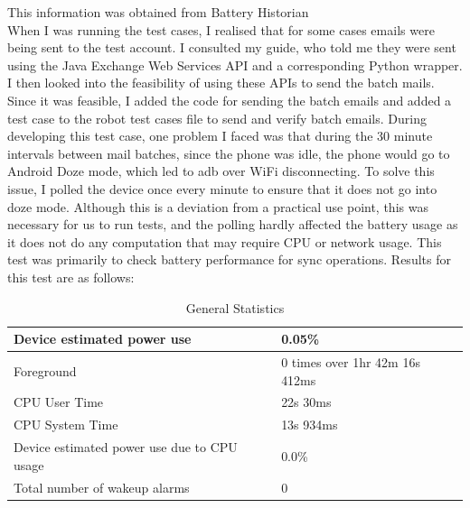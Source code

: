 \documentclass[a4paper,12pt]{article}
\begin{document}
This information was obtained from Battery Historian\\

When I was running the test cases, I realised that for some cases emails were being sent to the test account. I consulted my guide, who told me they were sent using the Java Exchange Web Services API and a corresponding Python wrapper. I then looked into the feasibility of using these APIs to send the batch mails. Since it was feasible, I added the code for sending the batch emails and added a test case to the robot test cases file to send and verify batch emails. During developing this test case, one problem I faced was that during the 30 minute intervals between mail batches, since the phone was idle, the phone would go to Android Doze mode, which led to adb over WiFi disconnecting. To solve this issue, I polled the device once every minute to ensure that it does not go into doze mode. Although this is a deviation from a practical use point, this was necessary for us to run tests, and the polling hardly affected the battery usage as it does not do any computation that may require CPU or network usage. This test was primarily to check battery performance for sync operations. Results for this test are as follows:
\pagebreak
\begin{table}[!h]
\begin{center}
\caption{General Statistics}
\label{my-label}
\begin{tabular}{|P{8cm}|P{6.5cm}|}
\hline
Device estimated power use                  & 0.05\%                      \\ \hline
Foreground                                  & 0 times over 1hr 42m 16s 412ms \\ \hline
CPU User Time                               & 22s 30ms                 \\ \hline
CPU System Time                             & 13s 934ms                \\ \hline
Device estimated power use due to CPU usage & 0.0\%                       \\ \hline
Total number of wakeup alarms               & 0     \\    \hline                
\end{tabular}
\end{center}
\end{table}
\end{document}
